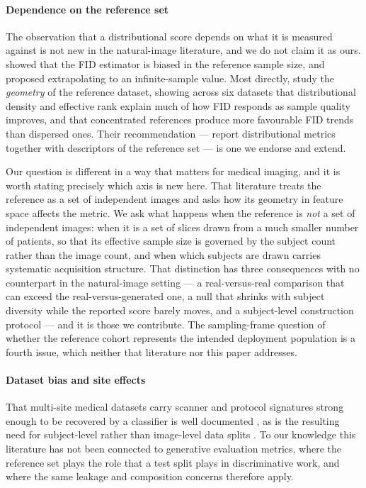 \documentclass[preprint,12pt,authoryear]{elsarticle}
\begin{document}
\paragraph{Dependence on the reference set}
The observation that a distributional score depends on what it is measured
against is not new in the natural-image literature, and we do not claim it as
ours. \citet{chong2020effectively} showed that the FID estimator is biased in
the reference sample size, and proposed extrapolating to an infinite-sample
value. Most directly, \citet{lee2026rethinking} study the \emph{geometry} of
the reference dataset, showing across six datasets that distributional density
and effective rank explain much of how FID responds as sample quality improves,
and that concentrated references produce more favourable FID trends than
dispersed ones. Their recommendation --- report distributional metrics together
with descriptors of the reference set --- is one we endorse and extend.

Our question is different in a way that matters for medical imaging, and it is
worth stating precisely which axis is new here. That literature treats the
reference as a set of independent images and asks how its geometry in feature
space affects the metric. We ask what happens when the reference is \emph{not}
a set of independent images: when it is a set of slices drawn from a much
smaller number of patients, so that its effective sample size is governed by the
subject count rather than the image count, and when which subjects are drawn
carries systematic acquisition structure. That distinction has three
consequences with no counterpart in the natural-image setting --- a real-versus-real
comparison that can exceed the real-versus-generated one, a null that shrinks
with subject diversity while the reported score barely moves, and a
subject-level construction protocol --- and it is those we contribute. The
sampling-frame question of whether the reference cohort represents the intended
deployment population is a fourth issue, which neither that literature nor this
paper addresses.

\paragraph{Dataset bias and site effects}
That multi-site medical datasets carry scanner and protocol signatures strong
enough to be recovered by a classifier is well documented
\citep{glocker2019machine, wachinger2021detect}, as is the resulting need for
subject-level rather than image-level data splits
\citep{varoquaux2022machine}. To our knowledge this literature has not been
connected to generative evaluation metrics, where the reference set plays the
role that a test split plays in discriminative work, and where the same
leakage and composition concerns therefore apply.
\end{document}
